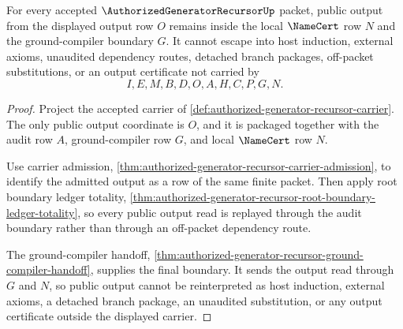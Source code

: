 \begin{theorem}
\label{thm:authorized-generator-recursor-output-namecert-nonescape}
For every accepted $\AuthorizedGeneratorRecursorUp$ packet, public output from the displayed output row $O$ remains inside the local $\NameCert$ row $N$ and the ground-compiler boundary $G$. It cannot escape into host induction, external axioms, unaudited dependency routes, detached branch packages, off-packet substitutions, or an output certificate not carried by
$$
I,E,M,B,D,O,A,H,C,P,G,N.
$$
\end{theorem}
\begin{proof}
Project the accepted carrier of \autoref{def:authorized-generator-recursor-carrier}. The only public output coordinate is $O$, and it is packaged together with the audit row $A$, ground-compiler row $G$, and local $\NameCert$ row $N$.

Use carrier admission, \autoref{thm:authorized-generator-recursor-carrier-admission}, to identify the admitted output as a row of the same finite packet. Then apply root boundary ledger totality, \autoref{thm:authorized-generator-recursor-root-boundary-ledger-totality}, so every public output read is replayed through the audit boundary rather than through an off-packet dependency route.

The ground-compiler handoff, \autoref{thm:authorized-generator-recursor-ground-compiler-handoff}, supplies the final boundary. It sends the output read through $G$ and $N$, so public output cannot be reinterpreted as host induction, external axioms, a detached branch package, an unaudited substitution, or any output certificate outside the displayed carrier.
\end{proof}

